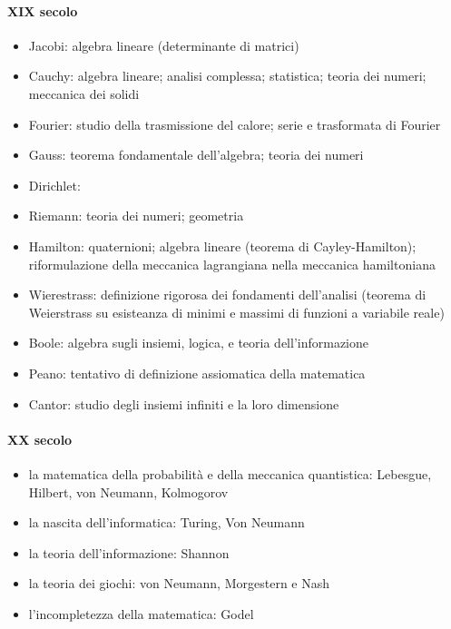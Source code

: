 \paragraph{XIX secolo}
\begin{itemize}
  \item Jacobi: algebra lineare (determinante di matrici)
  \item Cauchy: algebra lineare; analisi complessa; statistica; teoria dei numeri; meccanica dei solidi
  \item Fourier: studio della trasmissione del calore; serie e trasformata di Fourier
  \item Gauss: teorema fondamentale dell'algebra; teoria dei numeri
  \item Dirichlet:
  \item Riemann: teoria dei numeri; geometria
  \item Hamilton: quaternioni; algebra lineare (teorema di Cayley-Hamilton); riformulazione della meccanica lagrangiana nella meccanica hamiltoniana
  \item Wierestrass: definizione rigorosa dei fondamenti dell'analisi (teorema di Weierstrass su esisteanza di minimi e massimi di funzioni a variabile reale)
  \item Boole: algebra sugli insiemi, logica, e teoria dell'informazione
  \item Peano: tentativo di definizione assiomatica della matematica
  \item Cantor: studio degli insiemi infiniti e la loro dimensione
\end{itemize}
\paragraph{XX secolo}
\begin{itemize}
  \item la matematica della probabilità e della meccanica quantistica: Lebesgue, Hilbert, von Neumann, Kolmogorov
  \item la nascita dell'informatica: Turing, Von Neumann
  \item la teoria dell'informazione: Shannon
  \item la teoria dei giochi: von Neumann, Morgestern e Nash
  \item l'incompletezza della matematica: Godel
\end{itemize}

